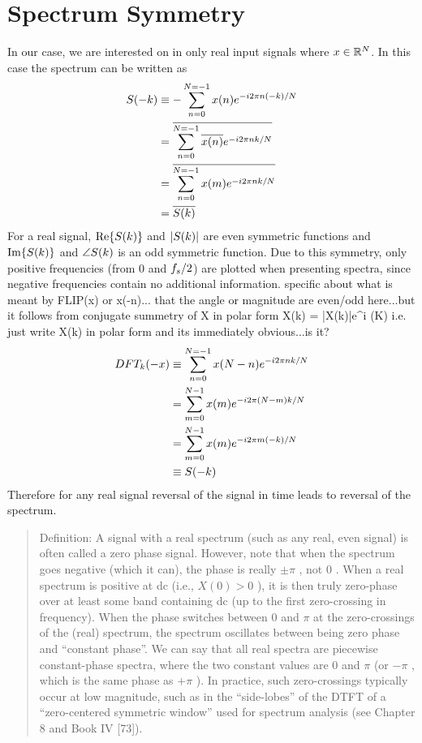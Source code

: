 \section{Spectrum Symmetry} In our case, we are interested on in only real input
signals where $x \in \mathbb{R}^N$. In this case the spectrum can be written as
\begin{align*} S(-k) &\equiv - \sum_{n=0}^{N=-1} x(n) e^{-i2 \pi n ( -k ) / N} \\ &=
\overline{ \sum_{n=0}^{N=-1} \overline{x(n)} e^{-i2 \pi n k / N}} \\ &= \overline{ \sum_{n=0}^{N=-1} x(m)
e^{-i2 \pi n k / N}} \\ &= \overline{S(k)}
\end{align*} For a real signal, $\textrm{Re}\{S(k)\}$ and $|S(k)|$
are even symmetric functions and $\textrm{Im}\{S(k)\}$ and $\angle
S(k)$ is an odd symmetric function. Due to this symmetry, only positive
frequencies (from $0$ and $f_s/2$) are plotted when presenting spectra, since
negative frequencies contain no additional information. %
specific about what is meant by FLIP(x) or x(-n)... %
that the angle or magnitude are even/odd here...but it follows from conjugate
summetry of X in polar form X(k) = |X(k)|e^{i \angleX(K)} i.e. just write X(k)
in polar form and its immediately obvious...is it?
\begin{align*} DFT_k(-x) &\equiv \sum_{n=0}^{N=-1} x(N-n) e^{-i2 \pi n k / N} \\ &=
\sum_{m=0}^{N-1} x(m) e^{- i 2 \pi (N-m)k / N} \\ &= \sum_{m=0}^{N-1} x(m) e^{-
i 2 \pi m ( -k ) / N} \\ &\equiv S(-k)
\end{align*} Therefore for any real signal reversal of the signal in time leads
to reversal of the spectrum.
\begin{quote} Definition: A signal with a real spectrum (such as any real, even
signal) is often called a zero phase signal. However, note that when the
spectrum goes negative (which it can), the phase is really $ \pm\pi$ , not 0 .
When a real spectrum is positive at dc (i.e., $ X(0)>0$ ), it is then truly
zero-phase over at least some band containing dc (up to the first zero-crossing
in frequency). When the phase switches between 0 and $ \pi $ at the
zero-crossings of the (real) spectrum, the spectrum oscillates between being
zero phase and ``constant phase''. We can say that all real spectra are
piecewise constant-phase spectra, where the two constant values are 0 and $ \pi
$ (or $ -\pi$ , which is the same phase as $ +\pi$ ). In practice, such
zero-crossings typically occur at low magnitude, such as in the ``side-lobes''
of the DTFT of a ``zero-centered symmetric window'' used for spectrum analysis
(see Chapter 8 and Book IV [73]).
\end{quote}

